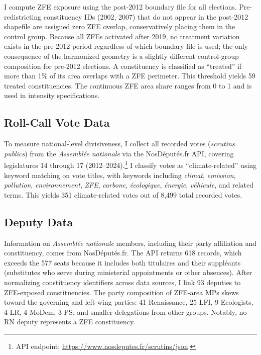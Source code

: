 \documentclass[12pt]{article}
\begin{document}
I compute ZFE exposure using the post-2012 boundary file for all elections. Pre-redistricting constituency IDs (2002, 2007) that do not appear in the post-2012 shapefile are assigned zero ZFE overlap, conservatively placing them in the control group. Because all ZFEs activated after 2019, no treatment variation exists in the pre-2012 period regardless of which boundary file is used; the only consequence of the harmonized geometry is a slightly different control-group composition for pre-2012 elections. A constituency is classified as ``treated'' if more than 1\% of its area overlaps with a ZFE perimeter. This threshold yields 59 treated constituencies. The continuous ZFE area share ranges from 0 to 1 and is used in intensity specifications.

\subsection{Roll-Call Vote Data}

To measure national-level divisiveness, I collect all recorded votes (\textit{scrutins publics}) from the \textit{Assembl\'ee nationale} via the NosDéputés.fr API, covering legislatures 14 through 17 (2012--2024).\footnote{API endpoint: \url{https://www.nosdeputes.fr/scrutins/json}.} I classify votes as ``climate-related'' using keyword matching on vote titles, with keywords including \textit{climat}, \textit{emission}, \textit{pollution}, \textit{environnement}, \textit{ZFE}, \textit{carbone}, \textit{\'ecologique}, \textit{\'energie}, \textit{v\'ehicule}, and related terms. This yields 351 climate-related votes out of 8,499 total recorded votes.

\subsection{Deputy Data}

Information on \textit{Assembl\'ee nationale} members, including their party affiliation and constituency, comes from NosDéputés.fr. The API returns 618 records, which exceeds the 577 seats because it includes both titulaires and their suppléants (substitutes who serve during ministerial appointments or other absences). After normalizing constituency identifiers across data sources, I link 93 deputies to ZFE-exposed constituencies. The party composition of ZFE-area MPs skews toward the governing and left-wing parties: 41 Renaissance, 25 LFI, 9 Ecologists, 4 LR, 4 MoDem, 3 PS, and smaller delegations from other groups. Notably, no RN deputy represents a ZFE constituency.
\end{document}
